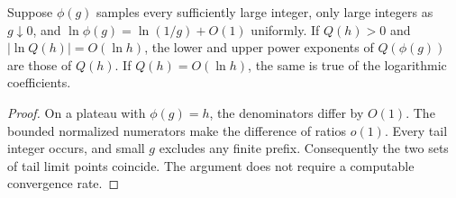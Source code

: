 \begin{lemma}[Reparametrization]\label{lem:unit}
Suppose $\phi(g)$ samples every sufficiently large integer, only large
integers as $g\downarrow0$, and $\ln\phi(g)=\ln(1/g)+O(1)$ uniformly.
If $Q(h)>0$ and $|\ln Q(h)|=O(\ln h)$, the lower and upper power
exponents of $Q(\phi(g))$ are those of $Q(h)$. If $Q(h)=O(\ln h)$,
the same is true of the logarithmic coefficients.
\end{lemma}
\begin{proof}
On a plateau with $\phi(g)=h$, the denominators differ by $O(1)$.
The bounded normalized numerators make the difference of ratios $o(1)$.
Every tail integer occurs, and small $g$ excludes any finite prefix.
Consequently the two sets of tail limit points coincide. The argument
does not require a computable convergence rate.
\end{proof}

